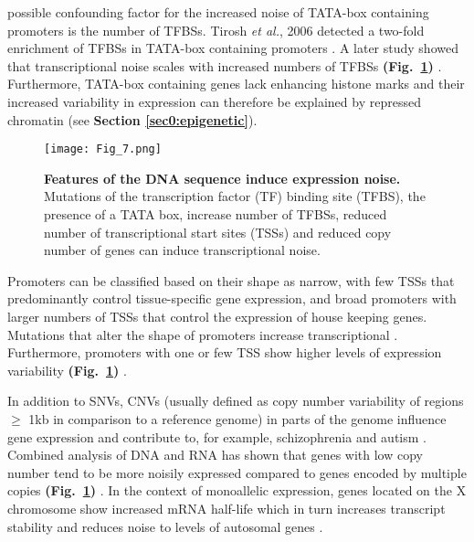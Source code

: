  possible confounding factor for the increased noise of TATA-box containing promoters is the number of TFBSs. 
Tirosh \textit{et al.}, 2006 detected a two-fold enrichment of TFBSs in TATA-box containing promoters \citep{Tirosh2006}. 
A later study showed that transcriptional noise scales with increased numbers of TFBSs \textbf{(Fig.~\ref{fig0:DNA_features})} \citep{Sharon2014}. 
Furthermore, TATA-box containing genes lack enhancing histone marks and their increased variability in expression can therefore be explained by repressed chromatin \citep{Choi2008} (see \textbf{Section \ref{sec0:epigenetic}}).  

\begin{figure}[!h]
\centering
\texttt{[image: Fig\_7.png]}
\caption[Features of the DNA sequence induce expression noise]{\textbf{Features of the DNA sequence induce expression noise.}\\
Mutations of the transcription factor (TF) binding site (TFBS), the presence of a TATA box, increase number of TFBSs, reduced number of transcriptional start sites (TSSs) and reduced copy number of genes can induce transcriptional noise.}
\label{fig0:DNA_features}
\end{figure}

Promoters can be classified based on their shape as narrow, with few \glspl{TSS} that predominantly control tissue-specific gene expression, and broad promoters with larger numbers of TSSs that control the expression of house keeping genes. 
Mutations that alter the shape of promoters increase transcriptional  \citep{Schor2017a}. 
Furthermore, promoters with one or few TSS show higher levels of expression variability \textbf{(Fig.~\ref{fig0:DNA_features})} \citep{Faure2017}.

\newpage

In addition to \glspl{SNV}, \glspl{CNV} (usually defined as copy number variability of regions $\geq$ 1kb in comparison to a reference genome) in parts of the genome influence gene expression and contribute to, for example, schizophrenia and autism \citep{Gamazon2015}. 
Combined analysis of DNA and RNA has shown that genes with low copy number tend to be more noisily expressed compared to genes encoded by multiple copies \textbf{(Fig.~\ref{fig0:DNA_features})} \citep{Dey2015}. 
In the context of monoallelic expression, genes located on the X chromosome show increased mRNA half-life which in turn increases transcript stability and reduces noise to levels of autosomal genes \citep{Faure2017}.\\

